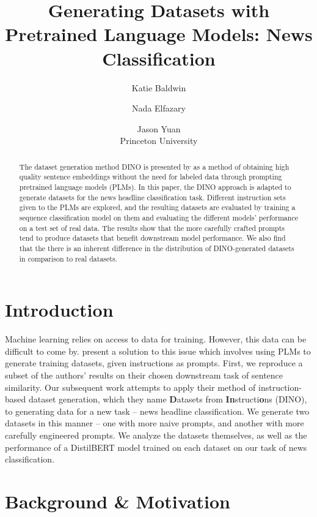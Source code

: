 \documentclass[11pt]{article}
\title{Generating Datasets with Pretrained Language Models: News Classification}
\author{Katie Baldwin \and Nada Elfazary  \and Jason Yuan \\ Princeton University}
\begin{document}
\graphicspath{{figures/}}

\maketitle

\begin{abstract}

The dataset generation method DINO is presented by \citet{schick2021generating} as a method of obtaining high quality sentence embeddings without the need for labeled data through prompting pretrained language models (PLMs). In this paper, the DINO approach is adapted to generate datasets for the news headline classification task. Different instruction sets given to the PLMs are explored, and the resulting datasets are evaluated by training a sequence classification model on them and evaluating the different models' performance on a test set of real data. The results show that the more carefully crafted prompts tend to produce datasets that benefit downstream model performance. We also find that the there is an inherent difference in the distribution of DINO-generated datasets in comparison to real datasets.
\end{abstract}




\section{Introduction}

Machine learning relies on access to data for training. However, this data can be difficult to come by. \citet{schick2021generating} present a solution to this issue which involves using PLMs to generate training datasets, given instructions as prompts. First, we reproduce a subset of the authors' results on their chosen downstream task of sentence similarity. Our subsequent work attempts to apply their method of instruction-based dataset generation, which they name \textbf{D}atasets from \textbf{In}structi\textbf{o}ns (DINO), to generating data for a new task – news headline classification. We generate two datasets in this manner -- one with more naive prompts, and another with more carefully engineered prompts. We analyze the datasets themselves, as well as the performance of a DistilBERT model trained on each dataset on our task of news classification. 




\section{Background \& Motivation}
\end{document}
